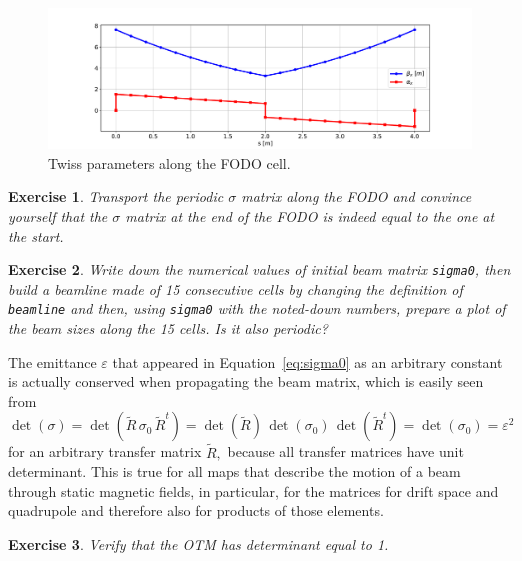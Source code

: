\documentclass{article}
\newtheorem{exercise}{Exercise}
\newcommand\eps{\varepsilon}
\begin{document}
\begin{figure}[tb]
\begin{center}
\includegraphics[width=1\textwidth]{_img_primer/exercise_23.pdf}
\end{center}
\caption{\label{fig:beta} Twiss parameters along the FODO cell.}
\end{figure}

\begin{exercise}
Transport the periodic $\sigma$ matrix along the FODO and convince yourself that the $\sigma$ matrix at the end of the FODO is indeed equal to the one at the start.
\end{exercise}

\begin{exercise}
Write down the numerical values of initial beam matrix {\tt sigma0}, then build a beamline made of 15 consecutive cells by changing the definition of {\tt beamline} and then, using {\tt sigma0} with the noted-down numbers, prepare a plot of the beam sizes along the 15 cells. Is it also periodic?
\end{exercise}

The emittance $\eps$ that appeared in Equation~\ref{eq:sigma0} as an arbitrary constant is
actually conserved when propagating the beam matrix, which is easily seen from 
\begin{equation}
\det(\sigma) = \det(\tilde R\, \sigma_0\, \tilde R^t) =
\det(\tilde R)\, \det(\sigma_0)\, \det(\tilde R^t) = \det(\sigma_0)=\eps^2
\end{equation}
for an arbitrary transfer matrix $\tilde R,$ because all transfer matrices have unit 
determinant. This is true for all maps that describe the motion of a beam through static
magnetic fields, in particular, for the matrices for drift space and quadrupole and 
therefore also for products of those elements. 

\begin{exercise}
Verify that the OTM has determinant equal to 1.
\end{exercise}
\end{document}

